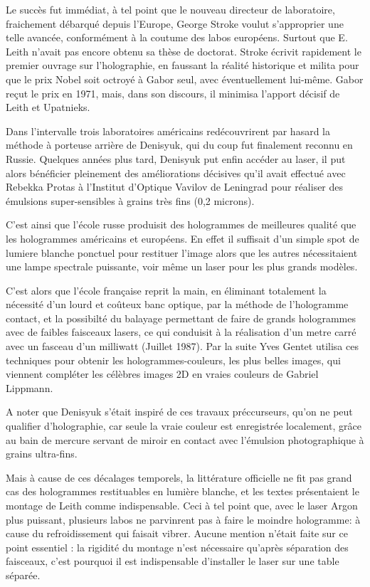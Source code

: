 \documentclass[a4paper,12pt]{article}
\begin{document}
Le succès fut immédiat, à tel point que le nouveau directeur de laboratoire, fraichement débarqué depuis l'Europe, George Stroke voulut s'approprier une telle avancée, conformément à la coutume des labos européens. Surtout que E. Leith n'avait pas encore obtenu sa thèse de doctorat. Stroke écrivit rapidement le premier ouvrage sur l'holographie, en faussant la réalité historique et milita pour que le prix Nobel soit octroyé à Gabor seul, avec éventuellement lui-même. Gabor reçut le prix en 1971, mais, dans son discours, il minimisa l'apport décisif de Leith et Upatnieks.


Dans l'intervalle trois laboratoires américains redécouvrirent par hasard la méthode à porteuse arrière de Denisyuk, qui du coup fut finalement reconnu en Russie. Quelques années plus tard, Denisyuk put enfin accéder au laser, il put alors bénéficier pleinement des améliorations décisives qu'il avait effectué avec Rebekka Protas à l'Institut d'Optique Vavilov de Leningrad pour réaliser des émulsions super-sensibles à grains très fins (0,2 microns). 


C'est ainsi que l'école russe produisit des hologrammes de meilleures qualité que les hologrammes américains et européens. En effet il suffisait d'un simple spot de lumiere blanche ponctuel pour restituer l'image alors que les autres nécessitaient une lampe spectrale puissante, voir m\^eme un laser pour les plus grands modèles.



C'est alors que l'école française reprit la main, en éliminant totalement la nécessité d'un lourd et co\^uteux banc optique, par la méthode de l'hologramme contact, et la possibilté du balayage permettant de faire de grands hologrammes avec de faibles faisceaux lasers, ce qui conduisit à la réalisation d'un metre carré avec un fasceau d'un milliwatt (Juillet 1987). Par la suite Yves Gentet utilisa ces techniques pour obtenir les hologrammes-couleurs, les plus belles images, qui viennent compléter les célèbres images 2D en vraies couleurs de Gabriel Lippmann. 



A noter que Denisyuk s'était inspiré de ces travaux préccurseurs, qu'on ne peut qualifier d'holographie, car seule la vraie couleur est enregistrée localement, gr\^ace au bain de mercure servant de miroir en contact avec l'émulsion photographique à grains ultra-fins.


Mais à cause de ces décalages temporels, la littérature officielle ne fit pas grand cas des hologrammes restituables en lumière blanche, et les textes présentaient le montage de Leith comme indispensable. Ceci à tel point que, avec le laser Argon plus puissant, plusieurs labos ne parvinrent pas à faire le moindre hologramme: à cause du refroidissement qui faisait vibrer. Aucune mention n'était faite sur ce point essentiel : la rigidité du montage n'est nécessaire qu'après séparation des faisceaux, c'est pourquoi il est indispensable d'installer le laser sur une table séparée.
\end{document}
